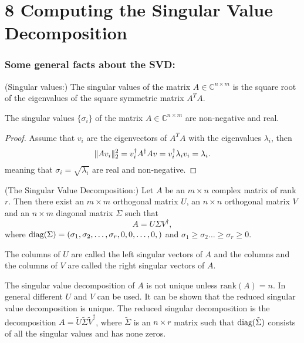 \section*{8 Computing the Singular Value Decomposition} %

\subsubsection*{Some general facts about the SVD:} %
\begin{definition}(Singular values:)
	The singular values of the matrix $A\in\mathbb C^{n\times m}$ is the 
	square root of the eigenvalues of the square symmetric matrix $A^TA$.
\end{definition}
\begin{theorem}
	The singular values $\{\sigma_i\}$ of the matrix $A\in\mathbb C^{n\times m}$ 
	are non-negative and real.
\end{theorem}
\begin{proof}
	Assume that $v_i$ are the eigenvectors of $A^TA$ with the eigenvalues $\lambda_i$,
	then 
	\[
		\lVert{Av_i}\rVert_2^2 = v_i^\dagger A^\dagger A v = v_i^\dagger \lambda_i v_i = \lambda_i. 
	\]
	meaning that $\sigma_i = \sqrt{\lambda_i}$ are real and non-negative.
\end{proof}
\begin{theorem}(The Singular Value Decomposition:)
	Let $A$ be an $m\times n$ complex matrix of rank $r$. Then there exist an $m\times m$
	orthogonal matrix $U$, an $n\times n$ orthogonal matrix $V$ and an $n\times m$ diagonal 
	matrix $\Sigma$ such that 
	\[
		A = U \Sigma V^\dagger,
	\]
	where $\text{diag}{(}\Sigma) = (\sigma_1,\sigma_2,\dots,\sigma_r, 0,0,\dots,0,)$ and 
	$\sigma_1\ge\sigma_2\dots\ge\sigma_r\ge0$.
\end{theorem}
\begin{definition}
	The columns of $U$ are called the left singular vectors of $A$ and the columns and the 
	columns of $V$ are called the right singular vectors of $A$.
\end{definition}
The singular value decomposition of $A$ is not unique unless $\text{rank}(A)=n$. In general 
different $U$ and $V$ can be used. It can be shown that the reduced singular value decomposition
is unique. 
The reduced singular decomposition is the decomposition 
$A = \tilde U\tilde \Sigma\tilde V^\dagger$, where $\tilde\Sigma$ is an $n\times r$
matrix such that $\text{diag}{}(\tilde\Sigma)$ consists of all the singular values and has none zeros.


